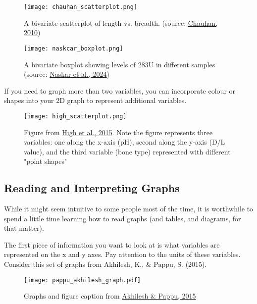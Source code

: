 \documentclass{article}
\begin{document}
\newpage

\begin{figure}
    \centering
    \texttt{[image: chauhan\_scatterplot.png]}
    \caption{A bivariate scatterplot of length vs. breadth. (source: \protect\hyperlink{chauhan}{Chauhan, 2010})}
    \label{fig:chauhan_scatterplot}
\end{figure}

\begin{figure} [hbt!]
    \centering
    \texttt{[image: naskcar\_boxplot.png]}
    \caption{A bivariate boxplot showing levels of 283U in different samples (source: \protect\hyperlink{naskar}{Naskar et al., 2024})}
    \label{fig:naskar_boxplot}
\end{figure}

\newpage
If you need to graph more than two variables, you can incorporate colour or shapes into your 2D graph to represent additional variables. 
\begin{figure}[hbt!]
    \centering
    \texttt{[image: high\_scatterplot.png]}
    \caption{Figure from \protect\hyperlink{high}{High et al., 2015}. Note the figure represents three variables: one along the x-axis (pH), second along the y-axis (D/L value), and the third variable (bone type) represented with different "point shapes"}
\end{figure}

\subsection{Reading and Interpreting Graphs}

While it might seem intuitive to some people most of the time, it is worthwhile to spend a little time learning how to read graphs (and tables, and diagrams, for that matter). 

The first piece of information you want to look at is what variables are represented on the x and y axes. Pay attention to the units of these variables. 
\newpage
Consider this set of graphs from Akhilesh, K., \& Pappu, S. (2015).

\begin{figure}[hbt!]
    \texttt{[image: pappu\_akhilesh\_graph.pdf]}
    \caption{Graphs and figure caption from \protect\hyperlink{pappu}{Akhilesh \& Pappu, 2015}}
    \label{fig:pappu-graph}
\end{figure}
\end{document}
